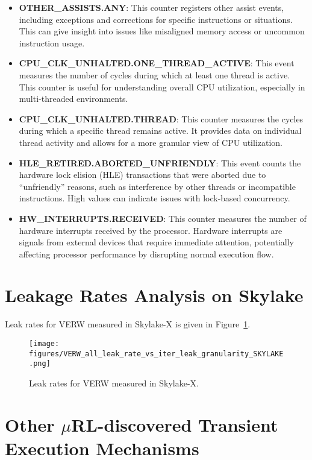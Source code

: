 \begin{itemize}
    \item \textbf{OTHER\_ASSISTS.ANY}: This counter registers other assist events, including exceptions and corrections for specific instructions or situations. This can give insight into issues like misaligned memory access or uncommon instruction usage.

    \item \textbf{CPU\_CLK\_UNHALTED.ONE\_THREAD\_ACTIVE}: This event measures the number of cycles during which at least one thread is active. This counter is useful for understanding overall CPU utilization, especially in multi-threaded environments.

    \item \textbf{CPU\_CLK\_UNHALTED.THREAD}: This counter measures the cycles during which a specific thread remains active. It provides data on individual thread activity and allows for a more granular view of CPU utilization.

    \item \textbf{HLE\_RETIRED.ABORTED\_UNFRIENDLY}: This event counts the hardware lock elision (HLE) transactions that were aborted due to “unfriendly” reasons, such as interference by other threads or incompatible instructions. High values can indicate issues with lock-based concurrency.

    \item \textbf{HW\_INTERRUPTS.RECEIVED}: This counter measures the number of hardware interrupts received by the processor. Hardware interrupts are signals from external devices that require immediate attention, potentially affecting processor performance by disrupting normal execution flow.
\end{itemize}
\section{Leakage Rates Analysis on Skylake}\label{sec:verw_skylake}

Leak rates for VERW measured in Skylake-X is given in Figure~\ref{fig:verwwww}.

\begin{figure}
    \centering
    \texttt{[image: figures/VERW\_all\_leak\_rate\_vs\_iter\_leak\_granularity\_SKYLAKE.png]}
    \caption{Leak rates for VERW measured in Skylake-X.}
    \label{fig:verwwww}
\end{figure}


\section{Other $\mu$RL-discovered Transient Execution Mechanisms}\label{sec:misc}

